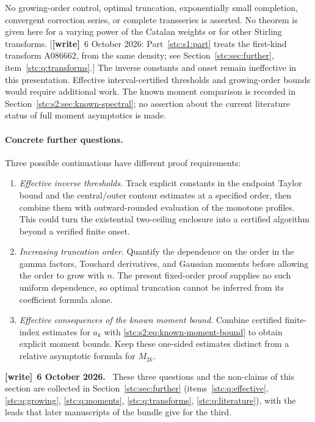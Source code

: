 \documentclass[11pt,letterpaper]{article}
\numberwithin{equation}{section}
\theoremstyle{remark}\newtheorem{remark}[theorem]{Remark}
\newenvironment{writenote}[1][]{\par\smallskip\begingroup\small
 \noindent\textbf{[write]}\if\relax\detokenize{#1}\relax\else~\textbf{#1.}\fi\ }%
 {\par\endgroup\smallskip}
\newcommand{\wtag}{\textup{\textbf{[write]}}}
\begin{document}
No growing-order control, optimal truncation, exponentially small completion, convergent correction series, or complete transseries is asserted. No theorem is given here for a varying power of the Catalan weights or for other Stirling transforms. \textup{[\wtag~6 October 2026: Part~\ref{stc:s1:part} treats the first-kind transform A086662, from the same density; see Section~\ref{stc:sec:further}, item~\ref{stc:q:transforms}.]} The inverse constants and onset remain ineffective in this presentation. Effective interval-certified thresholds and growing-order bounds would require additional work. The known moment comparison is recorded in Section~\ref{stc:s2:sec:known-spectral}; no assertion about the current literature status of full moment asymptotics is made.

\paragraph{Concrete further questions.}
Three possible continuations have different proof requirements:
\begin{enumerate}
 \item \emph{Effective inverse thresholds.} Track explicit constants in the endpoint Taylor bound and the central/outer contour estimates at a specified order, then combine them with outward-rounded evaluation of the monotone profiles. This could turn the existential two-ceiling enclosure into a certified algorithm beyond a verified finite onset.
 \item \emph{Increasing truncation order.} Quantify the dependence on the order in the gamma factors, Touchard derivatives, and Gaussian moments before allowing the order to grow with $n$. The present fixed-order proof supplies no such uniform dependence, so optimal truncation cannot be inferred from its coefficient formula alone.
 \item \emph{Effective consequences of the known moment bound.} Combine certified finite-index estimates for $a_k$ with \eqref{stc:s2:eq:known-moment-bound} to obtain explicit moment bounds. Keep these one-sided estimates distinct from a relative asymptotic formula for $M_{2k}$.
\end{enumerate}
\begin{writenote}[6 October 2026]
These three questions and the non-claims of this section are collected in Section~\ref{stc:sec:further} (items~\ref{stc:q:effective}, \ref{stc:q:growing}, \ref{stc:q:moments}, \ref{stc:q:transforms}, \ref{stc:q:literature}), with the leads that later manuscripts of the bundle give for the third.
\end{writenote}
\end{document}
